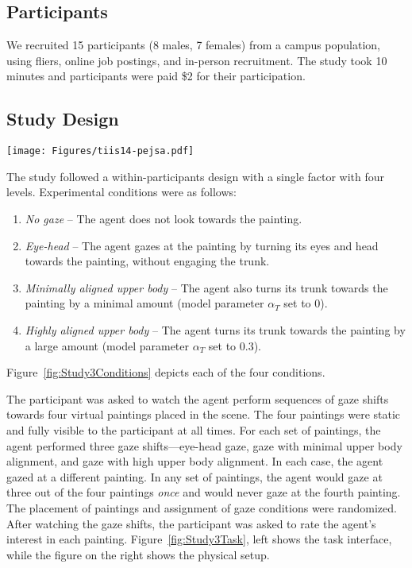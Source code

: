 \subsection{Participants}

We recruited 15 participants (8 males, 7 females) from a campus population, using fliers, online job postings, and in-person recruitment. The study took 10 minutes and participants were paid \$2 for their participation.

\subsection{Study Design}

\begin{figure*}[t]
\centering
\texttt{[image: Figures/tiis14-pejsa.pdf]}
\caption{Experimental conditions in Study 3.}
\label{fig:Study3Conditions}
\end{figure*}

The study followed a within-participants design with a single factor with four levels. Experimental conditions were as follows:

\begin{enumerate}
\item \emph{No gaze} -- The agent does not look towards the painting.
\item \emph{Eye-head} -- The agent gazes at the painting by turning its eyes and head towards the painting, without engaging the trunk.
\item \emph{Minimally aligned upper body} -- The agent also turns its trunk towards the painting by a minimal amount (model parameter $\alpha_T$ set to 0).
\item \emph{Highly aligned upper body} -- The agent turns its trunk towards the painting by a large amount (model parameter $\alpha_T$ set to 0.3).
\end{enumerate}

Figure~\ref{fig:Study3Conditions} depicts each of the four conditions.

The participant was asked to watch the agent perform sequences of gaze shifts towards four virtual paintings placed in the scene. The four paintings were static and fully visible to the participant at all times. For each set of paintings, the agent performed three gaze shifts---eye-head gaze, gaze with minimal upper body alignment, and gaze with high upper body alignment. In each case, the agent gazed at a different painting. In any set of paintings, the agent would gaze at three out of the four paintings \emph{once} and would never gaze at the fourth painting. The placement of paintings and assignment of gaze conditions were randomized. After watching the gaze shifts, the participant was asked to rate the agent's interest in each painting. Figure~\ref{fig:Study3Task}, left shows the task interface, while the figure on the right shows the physical setup.

